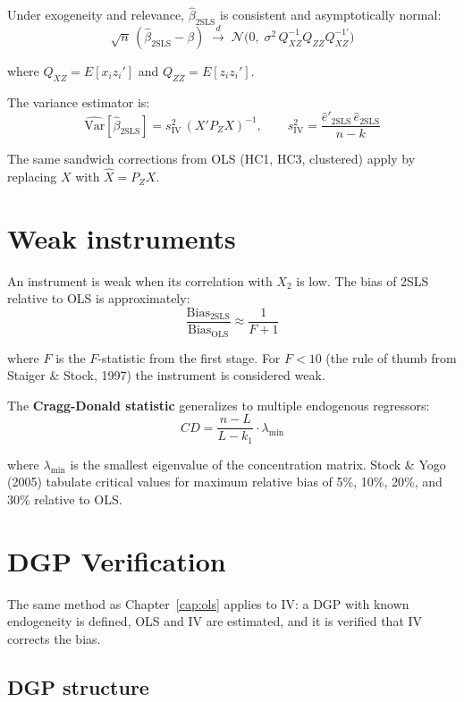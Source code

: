 Under exogeneity and relevance, $\hat{\beta}_{\mathrm{2SLS}}$ is consistent and
asymptotically normal:
\[
  \sqrt{n}\,(\hat{\beta}_{\mathrm{2SLS}} - \beta)
  \;\xrightarrow{d}\;
  \mathcal{N}\!\bigl(0,\; \sigma^2 \,Q_{XZ}^{-1} Q_{ZZ} Q_{XZ}^{-1\prime}\bigr)
\]

where $Q_{XZ} = E[x_i z_i']$ and $Q_{ZZ} = E[z_i z_i']$.

The variance estimator is:
\[
  \widehat{\mathrm{Var}}[\hat{\beta}_{\mathrm{2SLS}}]
  = s^2_{\mathrm{IV}}\,(X'P_Z X)^{-1},
  \qquad
  s^2_{\mathrm{IV}} = \frac{\hat{e}'_{\mathrm{2SLS}}\,\hat{e}_{\mathrm{2SLS}}}{n - k}
\]

The same sandwich corrections from OLS (HC1, HC3, clustered) apply
by replacing $X$ with $\hat{X} = P_Z X$.

\section{Weak instruments}

An instrument is weak when its correlation with $X_2$ is low. The bias of
2SLS relative to OLS is approximately:
\[
  \frac{\mathrm{Bias}_{\mathrm{2SLS}}}{\mathrm{Bias}_{\mathrm{OLS}}}
  \approx \frac{1}{F + 1}
\]

where $F$ is the $F$-statistic from the first stage. For $F < 10$ (the rule of
thumb from Staiger \& Stock, 1997) the instrument is considered weak.

The \textbf{Cragg-Donald statistic} generalizes to multiple endogenous
regressors:
\[
  CD = \frac{n - L}{L - k_1} \cdot \lambda_{\min}
\]

where $\lambda_{\min}$ is the smallest eigenvalue of the concentration matrix.
Stock \& Yogo (2005) tabulate critical values for maximum relative bias
of 5\%, 10\%, 20\%, and 30\% relative to OLS.

\section{DGP Verification}

The same method as Chapter~\ref{cap:ols} applies to IV: a DGP with known
endogeneity is defined, OLS and IV are estimated, and it is verified that IV
corrects the bias.

\subsection*{DGP structure}


